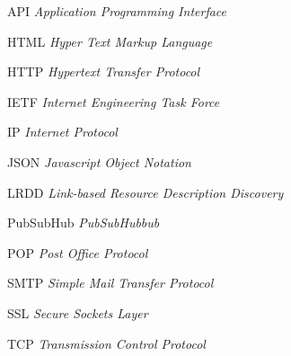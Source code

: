 \begin{siglas}
  \item[API]       \textit{Application Programming Interface}
  \item[HTML]      \textit{Hyper Text Markup Language}
  \item[HTTP]      \textit{Hypertext Transfer Protocol}
  \item[IETF]      \textit{Internet Engineering Task Force}
  \item[IP]        \textit{Internet Protocol}
  \item[JSON]      \textit{Javascript Object Notation}
  \item[LRDD]      \textit{Link-based Resource Description Discovery}
  \item[PubSubHub] \textit{PubSubHubbub}
  \item[POP]       \textit{Post Office Protocol}
  \item[SMTP]      \textit{Simple Mail Transfer Protocol}
  \item[SSL]       \textit{Secure Sockets Layer}
  \item[TCP]       \textit{Transmission Control Protocol}
\end{siglas}
